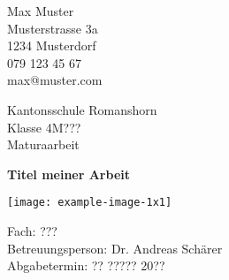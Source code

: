 
\begin{titlepage}
	\clearpage\thispagestyle{empty}	
	
	\begin{minipage}[t]{\textwidth}
		\begin{minipage}[t]{0.5\textwidth}
			Max Muster\\
			Musterstrasse 3a\\
			1234 Musterdorf\\
			079 123 45 67\\
			max@muster.com
		\end{minipage}
		\begin{minipage}[t]{0.5\textwidth}
			\begin{flushright}
				Kantonsschule Romanshorn\\
				Klasse 4M???\\
				Maturaarbeit
			\end{flushright}
		\end{minipage}
	\end{minipage}
	
	\vspace{4cm}
	
	{
		\centering
		\Huge\bfseries Titel meiner Arbeit\par
		\vspace{1cm}
		\texttt{[image: example-image-1x1]}\par
	}
	
	\vspace{9cm}	
	\noindent
	Fach: ??? \noindent\\
	Betreuungsperson: Dr. Andreas Schärer\\
	Abgabetermin: ?? ????? 20??
	
\end{titlepage}
